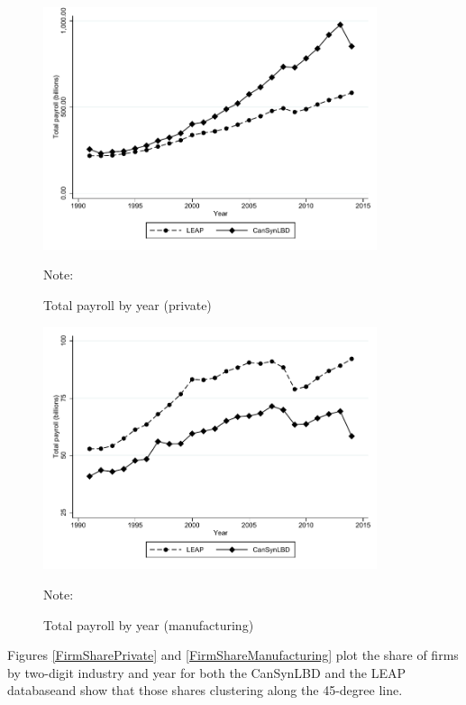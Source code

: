 \begin{figure} [H]
\centering
\caption{Total payroll by year (private)} \label{TotalPayrollPrivate}
\includegraphics[height=2.8in, width=.7\linewidth]{graphs/Total_payroll_by_year_private_bw.pdf} 
\begin{minipage}{0.85\textwidth}
{\footnotesize Note: \TableNote \par}
\end{minipage}
\end{figure}
\begin{figure} [H]
\centering
\caption{Total payroll by year (manufacturing)} \label{TotalPayrollManufacturing}
\includegraphics[height=2.8in, width=.7\linewidth]{graphs/Total_payroll_by_year_manufacturing_bw.pdf} 
\begin{minipage}{0.85\textwidth}
{\footnotesize Note: \TableNote \par}
\end{minipage}
\end{figure}

Figures \ref{FirmSharePrivate} and \ref{FirmShareManufacturing} plot the share of firms by two-digit industry and year for both the CanSynLBD and the LEAP databaseand show that those shares clustering along the 45-degree line.

